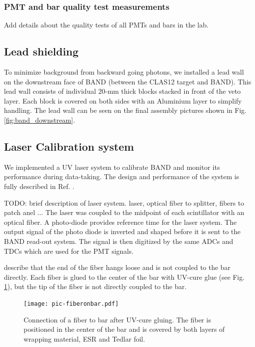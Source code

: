 \documentclass[3p,final,twocolumn]{elsarticle}
\begin{document}
\subsubsection{PMT and bar quality test measurements}
{\color{red} Add details about the quality tests of all PMTs and bars in the lab.}

\subsection{Lead shielding}
To minimize background from backward going photons, we installed a
lead wall on the downstream face of BAND (between the CLAS12 target
and BAND). This lead wall consists of individual 20-\si{\milli\meter}
thick blocks stacked in front of the veto layer. Each block is covered
on both sides with an Aluminium layer to simplify handling. The
lead wall can be seen on the final assembly pictures shown in
Fig. \ref{fig:band_downstream}.




\subsection{Laser Calibration system}
\label{sec:laserystem}
We implemented a UV laser system to calibrate BAND and monitor its
performance during data-taking. The design and performance of the
system is fully described in Ref. \cite{band-laser}. 

{\color{red} TODO: brief description of laser system.  laser, optical
  fiber to splitter, fibers to patch anel ...}  
The laser was coupled
to the midpoint of each scintillator with an optical fiber.  A
photo-diode provides reference time for the laser system. The output
signal of the photo diode is inverted and shaped before it is sent to
the BAND read-out system. The signal is then digitized by the same ADCs and
TDCs which are used for the PMT signals.

{\color{red} describe that the end of the fiber hangs loose and is not
  coupled to the bar directly.}
Each fiber is glued to the center of the bar with UV-cure glue (see
Fig. \ref{fig:pic-fiberonbar}), but the tip of the fiber is not
directly coupled to the bar.
\begin{figure}[tb]
	\centering
		\texttt{[image: pic-fiberonbar.pdf]}
	\caption{Connection of a fiber to bar after UV-cure gluing. The fiber is positioned in the center of the bar and is covered by both layers of wrapping material, ESR \cite{3MESR} and Tedlar foil.}
	\label{fig:pic-fiberonbar}
\end{figure}
\end{document}
